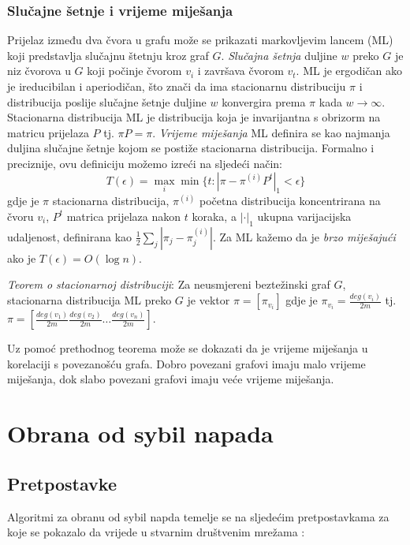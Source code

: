 \documentclass[times, utf8, seminar, numeric]{fer}
\begin{document}
\subsection{Slučajne šetnje i vrijeme miješanja}
Prijelaz između dva čvora u grafu može se prikazati markovljevim lancem (ML) koji predstavlja slučajnu štetnju kroz graf $G$. \textit{Slučajna šetnja} duljine $w$ preko $G$ je niz čvorova u $G$ koji počinje čvorom $v_i$ i završava čvorom $v_t$. ML je ergodičan  ako je ireducibilan i aperiodičan, što znači da ima stacionarnu distribuciju $\pi$ i distribucija poslije slučajne šetnje duljine $w$ konvergira prema $\pi$ kada $w \to \infty$. Stacionarna distribucija ML je distribucija koja je invarijantna s obrizorm na matricu prijelaza $P$ tj. $\pi P = \pi$. \textit{Vrijeme miješanja}  ML definira se kao najmanja duljina slučajne šetnje kojom se postiže stacionarna distribucija. Formalno i preciznije, ovu definiciju možemo izreći na sljedeći način:
\begin{equation} \label{eq:mixing}
  T(\epsilon) = \max_{i} \min \{t : |\pi - \pi^{(i)} P^t|_1 < \epsilon\}
\end{equation}
gdje je $\pi$ stacionarna distribucija, $\pi^{(i)}$ početna distribucija koncentrirana na čvoru $v_i$, $P^t$ matrica prijelaza nakon $t$ koraka, a $|\cdot|_1$ ukupna varijacijska udaljenost, definirana kao $\frac{1}{2} \sum_{j} |\pi_j - \pi_j^{(i)}|$. Za ML kažemo da je \textit{brzo miješajući}  ako je $T(\epsilon) = O(\log n)$. \cite{friends} 

\textit{Teorem o stacionarnoj distribuciji}: Za neusmjereni beztežinski graf $G$, stacionarna distribucija ML preko $G$ je vektor $\pi = [\pi_{v_i}]$ gdje je $\pi_{v_i} = \frac{deg (v_i)}{2 m}$ tj. $\pi = [\frac{deg (v_1)}{2 m} \frac{deg (v_2)}{2 m} \dots \frac{deg (v_n)}{2 m}]$.

Uz pomoć prethodnog teorema može se dokazati da je vrijeme miješanja u korelaciji s povezanošću grafa. Dobro povezani grafovi imaju malo vrijeme miješanja, dok slabo povezani grafovi imaju veće vrijeme miješanja. \cite{friends}

\chapter{Obrana od sybil napada}

\section{Pretpostavke}
Algoritmi za obranu od sybil napda temelje se na sljedećim pretpostavkama za koje se pokazalo da vrijede u stvarnim društvenim mrežama \cite{sybil-defender}:
\end{document}
